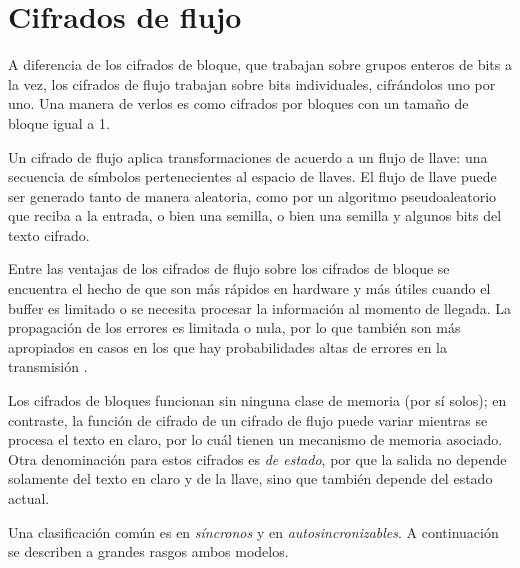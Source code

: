 %
%

\section{Cifrados de flujo}

A diferencia de los cifrados de bloque, que trabajan sobre grupos enteros de
bits a la vez, los cifrados de flujo trabajan sobre bits individuales,
cifrándolos uno por uno. Una manera de verlos es como cifrados por bloques con
un tamaño de bloque igual a 1.

Un cifrado de flujo aplica transformaciones de acuerdo a un flujo de llave:
una secuencia de símbolos pertenecientes al espacio de llaves. El flujo de
llave puede ser generado tanto de manera aleatoria, como por un algoritmo
pseudoaleatorio que reciba a la entrada, o bien una semilla, o bien una
semilla y algunos bits del texto cifrado.

Entre las ventajas de los cifrados de flujo sobre los cifrados de bloque se
encuentra el hecho de que son más rápidos en hardware y más útiles cuando
el buffer es limitado o se necesita procesar la información al momento de
llegada. La propagación de los errores es limitada o nula, por lo que también
son más apropiados en casos en los que hay probabilidades altas de errores en
la transmisión \cite{menezes}.

Los cifrados de bloques funcionan sin ninguna clase de memoria (por sí solos);
en contraste, la función de cifrado de un cifrado de flujo puede variar
mientras se procesa el texto en claro, por lo cuál tienen un mecanismo de
memoria asociado. Otra denominación para estos cifrados es \textit{de estado},
por que la salida no depende solamente del texto en claro y de la llave, sino
que también depende del estado actual.

Una clasificación común es en \textit{síncronos} y
en \textit{autosincronizables}. A continuación se describen a grandes rasgos
ambos modelos.



